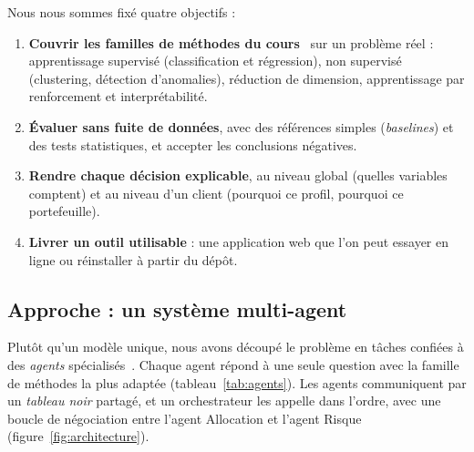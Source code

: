 Nous nous sommes fixé quatre objectifs :
\begin{enumerate}
  \item \textbf{Couvrir les familles de méthodes du cours}~\cite{cours_ml} sur un problème réel : apprentissage supervisé (classification et régression), non supervisé (clustering, détection d'anomalies), réduction de dimension, apprentissage par renforcement et interprétabilité.
  \item \textbf{Évaluer sans fuite de données}, avec des références simples (\emph{baselines}) et des tests statistiques, et accepter les conclusions négatives.
  \item \textbf{Rendre chaque décision explicable}, au niveau global (quelles variables comptent) et au niveau d'un client (pourquoi ce profil, pourquoi ce portefeuille).
  \item \textbf{Livrer un outil utilisable} : une application web que l'on peut essayer en ligne ou réinstaller à partir du dépôt.
\end{enumerate}

\subsection{Approche : un système multi-agent}

Plutôt qu'un modèle unique, nous avons découpé le problème en tâches confiées à des \emph{agents} spécialisés~\cite{wooldridge2009}. Chaque agent répond à une seule question avec la famille de méthodes la plus adaptée (tableau~\ref{tab:agents}). Les agents communiquent par un \emph{tableau noir} partagé, et un orchestrateur les appelle dans l'ordre, avec une boucle de négociation entre l'agent Allocation et l'agent Risque (figure~\ref{fig:architecture}).

